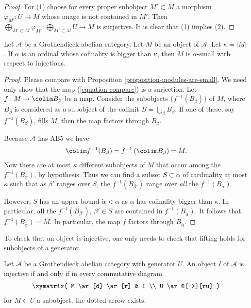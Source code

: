 \begin{proof}
For (1) choose for every proper subobject $M' \subset M$ a morphism
$\varphi_{M'} : U \to M$ whose image is not contained in $M'$. Then
$\bigoplus_{M' \subset M} \varphi_{M'} : \bigoplus_{M' \subset M} U \to M$
is surjective. It is clear that (1) implies (2).
\end{proof}

\begin{proposition}
\label{proposition-objects-are-small}
Let $\mathcal{A}$ be a Grothendieck abelian category. Let $M$ be an
object of $\mathcal{A}$. Let $\kappa = |M|$.
If $\alpha$ is an ordinal whose cofinality is bigger than $\kappa$,
then $M$ is $\alpha$-small with respect to injections.
\end{proposition}

\begin{proof}
Please compare with Proposition \ref{proposition-modules-are-small}.
We need only show that the map (\ref{equation-compare}) is a surjection.
Let $f : M \to \colim B_\beta$ be a map.
Consider the subobjects $\{f^{-1}(B_\beta)\}$ of $M$, where $B_\beta$
is considered as a subobject of the colimit $B = \bigcup_\beta B_\beta$.
If one of these, say $f^{-1}(B_\beta)$, fills $M$,
then the map factors through $B_\beta$.

\medskip\noindent
Because $\mathcal{A}$ has AB5 we have
$$
\colim f^{-1}(B_\beta) = f^{-1}\left(\colim B_\beta\right) = M.
$$
Now there are at most $\kappa$ different subobjects of $M$ that occur among
the $f^{-1}(B_\alpha)$, by hypothesis.
Thus we can find a subset $S \subset \alpha$ of cardinality at most
$\kappa$ such that as $\beta'$ ranges over $S$, the
$f^{-1}(B_{\beta'})$ range over \emph{all} the $f^{-1}(B_\alpha)$.

\medskip\noindent
However, $S$ has an upper bound $\widetilde{\alpha} < \alpha$ as
$\alpha$ has cofinality bigger than $\kappa$. In particular, all the
$f^{-1}(B_{\beta'})$, $\beta' \in S$ are contained in
$f^{-1}(B_{\widetilde{\alpha}})$.
It follows that $f^{-1}(B_{\widetilde{\alpha}}) = M$.
In particular, the map $f$ factors through $B_{\widetilde{\alpha}}$.
\end{proof}

\begin{lemma}
\label{lemma-characterize-injective}
\begin{slogan}
To check that an object is injective, one only needs to check that lifting
holds for subobjects of a generator.
\end{slogan}
Let $\mathcal{A}$ be a Grothendieck abelian category with generator $U$.
An object $I$ of $\mathcal{A}$ is injective if and only if in every
commutative diagram
$$
\xymatrix{
M \ar[d] \ar[r] &  I \\
U \ar@{-->}[ru]
}
$$
for $M \subset U$ a subobject, the dotted arrow exists.
\end{lemma}

